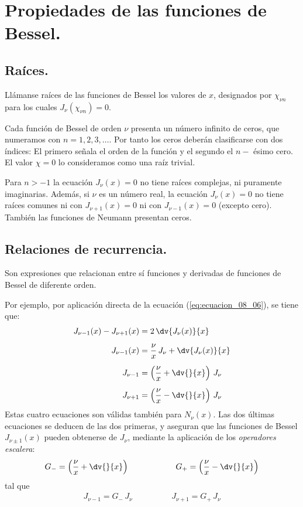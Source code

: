 \section{Propiedades de las funciones de Bessel.}
\subsection{Raíces.}
Llámanse raíces de las funciones de Bessel los valores de $x$, designados por $\chi_{\nu n}$ para los cuales $J_{\nu} (\chi_{\nu n}) = 0$. 
\par
Cada función de Bessel de orden $\nu$ presenta un número infinito de ceros, que numeramos con $n = 1, 2, 3, \ldots$. Por tanto los ceros deberán clasificarse con dos índices: El primero señala el orden de la función y el segundo el $n-$ ésimo cero. El valor $\chi = 0$ lo consideramos como una raíz trivial.
\par
Para $n > -1$ la ecuación $J_{\nu} (x) = 0$ no tiene raíces complejas, ni puramente imaginarias. Además, si $\nu$ es un número real, la ecuación $J_{\nu} (x) = 0$ no tiene raíces comunes ni con $J_{\nu+1} (x) = 0$ ni con $J_{\nu-1} (x) = 0$ (excepto cero). También las funciones de Neumann presentan ceros.
\subsection{Relaciones de recurrencia.}
Son expresiones que relacionan entre sí funciones y derivadas de funciones de Bessel de diferente orden.
\par
Por ejemplo, por aplicación directa de la ecuación (\ref{eq:ecuacion_08_06}), se tiene que:
\begin{align*}
J_{\nu-1} (x) - J_{\nu+1} (x)&= 2 \, \dv{J_{\nu}(x)}{x} \\[0.5em]
J_{\nu-1} (x) &= \dfrac{\nu}{x} \, J_{\nu} + \dv{J_{\nu}(x)}{x} \\[0.5em]
J_{\nu-1} &= \left( \dfrac{\nu}{x} + \dv{}{x} \right) \, J_{\nu} \\[0.5em]
J_{\nu+1} &= \left( \dfrac{\nu}{x} - \dv{}{x} \right) \, J_{\nu}
\end{align*}
Estas cuatro ecuaciones son válidas también para $N_{\nu} (x)$. Las dos últimas ecuaciones se deducen de las dos primeras, y aseguran que las funciones de Bessel $J_{\nu \pm 1} (x)$ pueden obtenerse de $J_{\nu}$, mediante la aplicación de los \emph{operadores escalera}:
\begin{align*}
G_{-} = \left( \dfrac{\nu}{x} + \dv{}{x} \right) \hspace{2cm} G_{+} = \left( \dfrac{\nu}{x} - \dv{}{x} \right)
\end{align*}
tal que
\begin{align*}
J_{\nu-1} = G_{-} \, J_{\nu} \hspace{2cm} J_{\nu+1} = G_{+} \, J_{\nu}
\end{align*}
